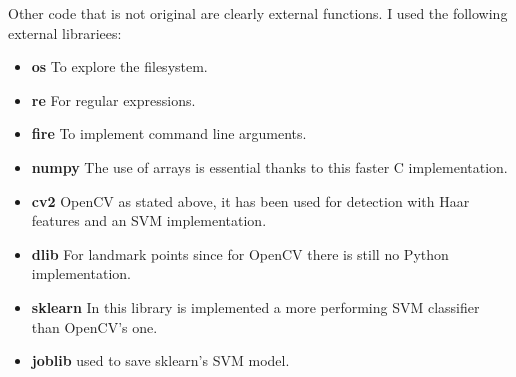 Other code that is not original are clearly external functions.
I used the following external librariees:
\begin{itemize}
    \item \textbf{os} To explore the filesystem.
    \item \textbf{re} For regular expressions.
    \item \textbf{fire} To implement command line arguments.
    \item \textbf{numpy} The use of arrays is essential thanks to this faster C implementation.
    \item \textbf{cv2} OpenCV as stated above, it has been used for detection with Haar features and an SVM implementation.
    \item \textbf{dlib} For landmark points since for OpenCV there is still no Python implementation.
    \item \textbf{sklearn} In this library is implemented a more performing SVM classifier than OpenCV's one.
    \item \textbf{joblib} used to save sklearn's SVM model.
\end{itemize}
